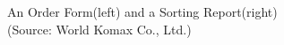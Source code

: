 \documentclass[a4paper]{amsart}
\numberwithin{equation}{section} %
\numberwithin{figure}{section} %
\numberwithin{table}{section}
\theoremstyle{plain}
\theoremstyle{definition}
\theoremstyle{plain}
\theoremstyle{plain}
\theoremstyle{plain}
\theoremstyle{plain}
\theoremstyle{plain}
\begin{document}
\begin{figure}[h!]
	\centering
	\caption{An Order Form(left) and a Sorting Report(right) \\(Source: World Komax Co., Ltd.)}
	\label{fig:Order_Sorting}       %
\end{figure}
\end{document}
